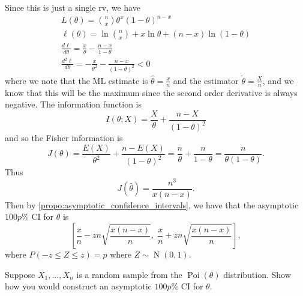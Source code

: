 \documentclass[notoc,notitlepage]{tufte-book}
\DeclareMathOperator{\Poi}{Poi }
\DeclareMathOperator{\Nor}{N }
\begin{document}
\begin{solution}
  Since this is just a single rv, we have
  \begin{gather*}
    L(\theta) = \binom{n}{x} \theta^x ( 1 - \theta )^{n - x} \\
    \ell(\theta) = \ln \binom{n}{x} + x \ln \theta + (n - x) \ln (1 - \theta) \\
    \frac{d \ell}{d \theta} = \frac{x}{\theta} - \frac{n - x}{1 - \theta} \\
    \frac{d^2 \ell}{d \theta} = - \frac{x}{\theta^2} - \frac{n - x}{(1 - \theta)^2} < 0
  \end{gather*}
  where we note that the ML estimate is $\hat{\theta} = \frac{x}{n}$ and the estimator $\tilde{\theta} = \frac{X}{n}$, and we know that this will be the maximum since the second order derivative is always negative. The information function is
  \begin{equation*}
    I(\theta; X) = \frac{X}{\theta} + \frac{n - X}{(1 - \theta)^2}
  \end{equation*}
  and so the Fisher information is
  \begin{equation*}
    J(\theta) = \frac{E(X)}{\theta^2} + \frac{n - E(X)}{(1 - \theta)^2} = \frac{n}{\theta} + \frac{n}{1 - \theta} = \frac{n}{\theta ( 1 - \theta )}.
  \end{equation*}
  Thus
  \begin{equation*}
    J(\hat{\theta}) = \frac{n^3}{x(n - x)}.
  \end{equation*}
  Then by \cref{propo:asymptotic_confidence_intervals}, we have that the asymptotic $100p\%$ CI for $\theta$ is
  \begin{equation*}
    \left[ \frac{x}{n} - zn \sqrt{\frac{x ( n - x )}{n}}, \; \frac{x}{n} + zn \sqrt{\frac{x (n - x)}{n}} \right],
  \end{equation*}
  where $P(-z \leq Z \leq z) = p$ where $Z \sim \Nor(0, 1)$.
\end{solution}

\begin{eg}\label{eg:6_23}
  Suppose $X_1, ... ,X_n$ is a random sample from the $\Poi(\theta)$ distribution. Show how you would construct an asymptotic $100p\%$ CI for $\theta$.
\end{eg}
\end{document}
